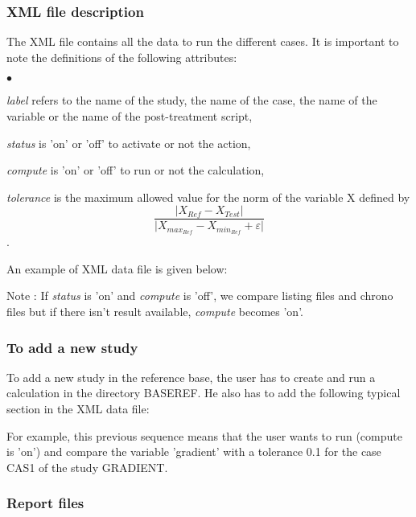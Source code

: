 \subsubsection{XML file description}

The XML file contains all the data to run the different cases.
It is important to note the definitions of the following attributes:
\begin{list}{$\bullet$}{}
\item {\it label} refers to the name of the study, the name of the case,
the name of the variable or the name of the post-treatment script,
\item {\it status} is 'on' or 'off' to activate or not the action,
\item {\it compute} is 'on' or 'off' to run or not the calculation,
\item {\it tolerance} is the maximum allowed value for the norm of the
      variable X defined by
      $$\frac{\vert{X_{Ref}-X_{Test}}\vert}{\vert{X_{max_{Ref}}-X_{min_{Ref}}}+\varepsilon\vert}$$ .
\end{list}

An example of XML data file is given below:

\begin{alltt}

\end{alltt}

Note : If {\it status} is 'on' and {\it compute} is 'off', we compare
listing files and chrono files but if there isn't result available,
{\it compute} becomes 'on'.


\subsubsection{To add a new study}

To add a new study in the reference base, the user has to create and run
a calculation in the directory BASEREF. He also has to add the following
typical section in the XML data file:
\begin{alltt}

\end{alltt}
For example, this previous sequence means that the user wants to run
(compute is 'on') and compare the variable 'gradient' with a tolerance
0.1 for the case CAS1 of the study GRADIENT.


\subsubsection{Report files}

